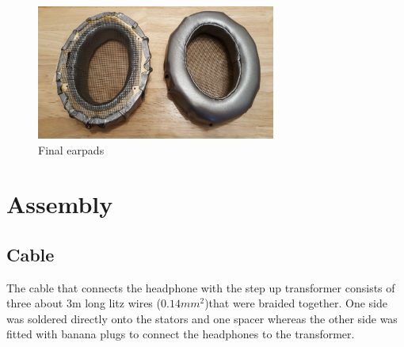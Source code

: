 \documentclass{article}
\begin{document}
\begin{figure}
\centering
\includegraphics[width=0.7\textwidth]{images/earpads_final.jpg}
\caption{Final earpads}
\label{f:pads:final}
\end{figure}


\section{Assembly}
\label{s:assembly}

\subsection{Cable}
The cable that connects the headphone with the step up transformer consists of three about 3m long litz wires ($0.14mm^2$)that were braided together. One side was soldered directly onto the stators and one spacer whereas the other side was fitted with banana plugs to connect the headphones to the transformer.
\end{document}
